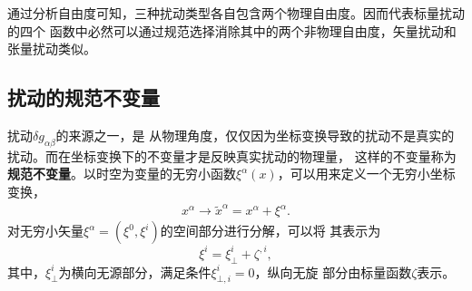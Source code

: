 通过分析自由度可知，三种扰动类型各自包含两个物理自由度。因而代表标量扰动的四个
函数中必然可以通过规范选择消除其中的两个非物理自由度，矢量扰动和张量扰动类似。

\subsection{扰动的规范不变量}


扰动$\delta g_{\alpha\beta}$的来源之一，是
从物理角度，仅仅因为坐标变换导致的扰动不是真实的扰动。而在坐标变换下的不变量才是反映真实扰动的物理量，
这样的不变量称为\textbf{规范不变量}。以时空为变量的无穷小函数$\xi^{\alpha}(x)$，可以用来定义一个无穷小坐标变换，
\begin{align}
	\label{eq:coordinate-transformation}
	x^{\alpha} \rightarrow \tilde{x}^{\alpha}=x^{\alpha}+\xi^{\alpha}.
\end{align}
对无穷小矢量$\xi^{\alpha}=(\xi^{0}, \xi^{i})$的空间部分进行分解，可以将
其表示为
\begin{equation}
  \label{eq:decomposition-of-xi}
  \xi^{i}=\xi^{i}_{\bot}+\zeta^{,i},
\end{equation}
其中，$\xi^{i}_{\bot}$为横向无源部分，满足条件$\xi^{i}_{\bot,i}=0$，纵向无旋
部分由标量函数$\zeta$表示。

